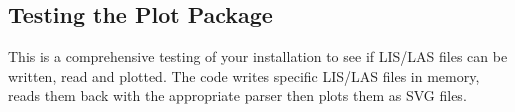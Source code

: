 \documentclass[letterpaper,10pt,english]{sphinxmanual}
\begin{document}
\begin{sphinxVerbatim}[commandchars=\\\{\}]
                                               
                                            
                                           
                                             
\end{sphinxVerbatim}


\subsection{Testing the Plot Package}
\label{\detokenize{testing/test_plot:testing-the-plot-package}}\label{\detokenize{testing/test_plot::doc}}
This is a comprehensive testing of your installation to see if LIS/LAS files can be written, read and plotted. The code writes specific LIS/LAS files in memory, reads them back with the appropriate parser then plots them as SVG files.
\end{document}
